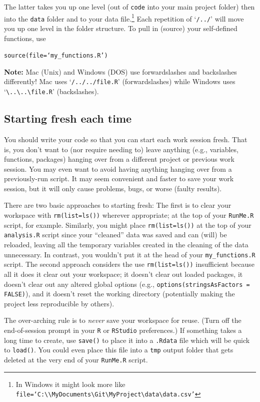 \documentclass[12pt,letterpaper]{article}
\begin{document}
\noindent
The latter takes you up one level (out of \texttt{code} into your main project folder) then into the \texttt{data} folder and to your data file.\footnote{In Windows it might look more like \texttt{file=`C:\textbackslash \textbackslash MyDocuments\textbackslash Git\textbackslash MyProject\textbackslash data\textbackslash data.csv'}}
Each repetition of `\texttt{/../}' will move you up one level in the folder structure.
To pull in (source) your self-defined functions, use

\texttt{source(file=`my\_functions.R')}

\noindent
\textbf{Note:} Mac (Unix) and Windows (DOS) use forwardslashes and backslashes differently!  Mac uses `\texttt{/../../file.R}' (forwardslashes) while Windows uses `\texttt{\textbackslash..\textbackslash..\textbackslash file.R}' (backslashes).


\subsection{Starting fresh each time}
You should write your code so that you can start each work session fresh.
That is, you don't want to (nor require needing to) leave anything (e.g., variables, functions, packages) hanging over from a different project or previous work session.
You may even want to avoid having anything hanging over from a previously-run script.
It may seem convenient and faster to save your work session, but it will only cause problems, bugs, or worse (faulty results).

There are two basic approaches to starting fresh:
The first is to clear your workspace with \texttt{rm(list=ls())} wherever appropriate;
at the top of your \texttt{RunMe.R} script, for example.
Similarly, you might place \texttt{rm(list=ls())} at the top of your \texttt{analysis.R} script since your ``cleaned'' data was saved and can (will) be reloaded, leaving all the temporary variables created in the cleaning of the data unnecessary.
In contrast, you wouldn't put it at the head of your \texttt{my\_functions.R} script.
The second approach considers the use \texttt{rm(list=ls())} insufficient because all it does it clear out your workspace;
it doesn't clear out loaded packages,
it doesn't clear out any altered global options (e.g., \texttt{options(stringsAsFactors = FALSE)}),
and it doesn't reset the working directory (potentially making the project less reproducible by others).

The over-arching rule is to \emph{never} save your workspace for reuse.
(Turn off the end-of-session prompt in your \texttt{R} or \texttt{RStudio} preferences.)
If something takes a long time to create, use \texttt{save()} to place it into a \texttt{.Rdata} file which will be quick to \texttt{load()}. You could even place this file into a \texttt{tmp} output folder that gets deleted at the very end of your \texttt{RunMe.R} script.
\end{document}
